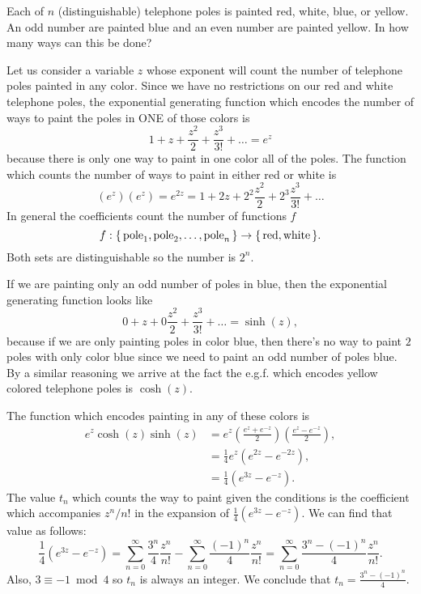 \documentclass[12pt]{memoir}
\begin{document}
\begin{Ej}[Exercise 6]
  Each of $n$ (distinguishable) telephone poles is painted red, white, blue, or
  yellow. An odd number are painted blue and an even number are painted yellow. In how many ways can this be done?
\end{Ej}

\begin{ptcbr}
Let us consider a variable $z$ whose exponent will count the number of telephone poles painted in any color. Since we have no restrictions on our red and white telephone poles, the exponential generating function which encodes the number of ways to paint the poles in ONE of those colors is 
$$1+z+\frac{z^2}{2}+\frac{z^3}{3!}+\dots=e^z$$
because there is only one way to paint in one color all of the poles. The function which counts the number of ways to paint in either red or white is 
$$(e^z)(e^z)=e^{2z}=1+2z+2^2\frac{z^2}{2}+2^3\frac{z^3}{3!}+\dots$$
In general the coefficients count the number of functions $f$ 
$$f:\{\,\text{pole}_1,\text{pole}_2,\dots,\text{pole}_n\,\}\to\{\,\text{red},\text{white}\,\}.$$
Both sets are distinguishable so the number is $2^n$.\par 
If we are painting only an odd number of poles in blue, then the exponential generating function looks like 
$$0+z+0\frac{z^2}{2}+\frac{z^3}{3!}+\dots=\sinh(z),$$
because if we are only painting poles in color blue, then there's no way to paint $2$ poles with only color blue since we need to paint an odd number of poles blue. By a similar reasoning we arrive at the fact the e.g.f. which encodes yellow colored telephone poles is $\cosh(z)$.\par 
The function which encodes painting in any of these colors is 
\begin{align*}
    e^z\cosh(z)\sinh(z)&=e^z\left(\frac{e^z+e^{-z}}{2}\right)\left(\frac{e^z-e^{-z}}{2}\right),\\
    &=\frac{1}{4}e^z(e^{2z}-e^{-2z}),\\
    &=\frac{1}{4}(e^{3z}-e^{-z}).
\end{align*}
The value $t_n$ which counts the way to paint given the conditions is the coefficient which accompanies $z^n/n!$ in the expansion of $\frac{1}{4}(e^{3z}-e^{-z})$. We can find that value as follows:
$$\frac{1}{4}(e^{3z}-e^{-z})=\sum_{n=0}^\infty\frac{3^n}{4}\frac{z^n}{n!}-\sum_{n=0}^\infty\frac{(-1)^n}{4}\frac{z^n}{n!}=\sum_{n=0}^\infty\frac{3^n-(-1)^n}{4}\frac{z^n}{n!}.$$
Also, $3\equiv -1\bmod 4$ so $t_n$ is always an integer. We conclude that $t_n=\frac{3^n-(-1)^n}{4}$. 
\end{ptcbr}
\end{document}
